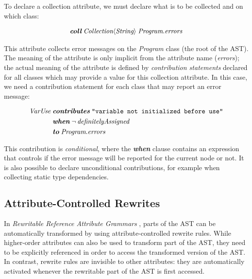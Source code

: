 \documentclass[10pt, twoside, openright]{book}
\begin{document}
To declare a collection attribute, we must declare what is to be collected and on which
class:


\begin{equation*}
\textit{\textbf{coll}} \; \textit{Collection}\langle\textit{String}\rangle \; \textit{Program}.\textit{errors}
\end{equation*}

\noindent
This attribute collects error messages on the \emph{Program} class (the
root of the AST). The meaning of the attribute is only implicit from the attribute name
(\emph{errors}); the actual meaning of the attribute is defined by
\emph{contribution statements} declared for all classes which may provide a
value for this collection attribute. In this case, we need a contribution statement for
each class that may report an error message:


\begin{align*}
\textit{VarUse} \; & \textit{\textbf{contributes}} \; \texttt{"variable not initialized before use"} \\
  & \textit{\textbf{when}} \; \neg \, \textit{definitelyAssigned} \\
  & \textit{\textbf{to}} \; \textit{Program}.\textit{errors}
\end{align*}

\noindent
This contribution is \emph{conditional}, where the \textit{\textbf{when}} clause contains an expression
that controls if the error message will be reported for the current node or not.
It is also possible to declare unconditional contributions, for example when collecting
static type dependencies.

\subsection{Attribute-Controlled Rewrites}

In \emph{Rewritable Reference Attribute Grammars} \cite{DBLP:conf/ecoop/EkmanH04},
parts of the AST can be automatically transformed
by using attribute-controlled rewrite rules.
While higher-order attributes can also be used to transform part of the AST, they need to be
explicitly referenced in order
to access the transformed version of the AST. In contrast, rewrite rules are invisible to
other attributes: they are automatically activated whenever the rewritable part of the AST is
first accessed.
\end{document}
